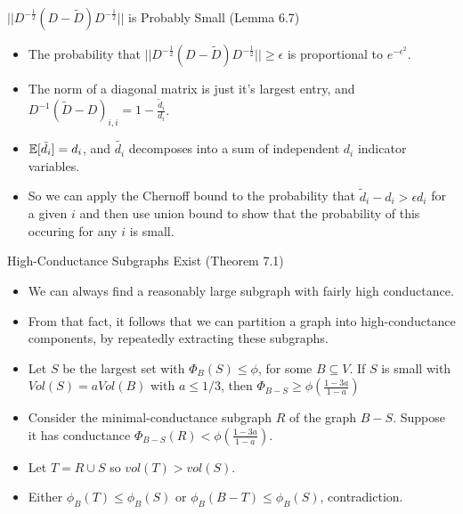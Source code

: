 \documentclass[presentation]{beamer}
\begin{document}
\begin{frame}[label={sec:org0f9239d}]{\(||D^{-\frac12}(D-\tilde{D}) D^{-\frac12}||\) is Probably Small (Lemma 6.7)}
\begin{itemize}
\item The probability that \(||D^{-\frac12}(D-\tilde{D})D^{-\frac12}|| \ge \epsilon\) is proportional to \(e^{-\epsilon^2}\).
\item The norm of a diagonal matrix is just it's largest entry, and \(D^{-1}(\tilde{D}-D)_{i,i}=1-\frac{\tilde{d}_i}{d_i}\).
\item \(\mathbb{E}[\tilde{d}_i]=d_i\), and \(\tilde{d_i}\) decomposes into a sum of independent \(d_i\) indicator variables.
\item So we can apply the Chernoff bound to the probability that \(\tilde{d}_i-d_i > \epsilon d_i\) for a given \(i\) and then use union bound to show that the probability of this occuring for any \(i\) is small.
\end{itemize}
\end{frame}
\begin{frame}[label={sec:org02e072c}]{High-Conductance Subgraphs Exist (Theorem 7.1)}
\begin{itemize}
\item We can always find a reasonably large subgraph with fairly high conductance.
\item From that fact, it follows that we can partition a graph into high-conductance components, by repeatedly extracting these subgraphs.
\item Let \(S\) be the largest set with \(\Phi_B(S) \le \phi\), for some \(B \subseteq V\). If \(S\) is small with \(Vol(S) = a Vol(B)\) with \(a\le 1/3\), then \(\Phi_{B-S} \ge \phi(\frac{1-3a}{1-a})\)
\item Consider the minimal-conductance subgraph \(R\) of the graph \(B-S\). Suppose it has conductance \(\Phi_{B-S}(R) < \phi (\frac{1-3a}{1-a})\).
\item Let \(T= R \cup S\) so \(vol(T) > vol(S)\).
\item Either \(\phi_B(T) \le \phi_B(S)\) or \(\phi_B(B-T) \le \phi_B(S)\), contradiction.
\end{itemize}
\end{frame}
\end{document}
